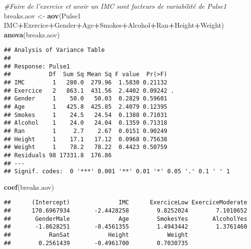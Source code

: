 \documentclass[]{article}
\newenvironment{Shaded}{\begin{snugshade}}{\end{snugshade}}
\newcommand{\KeywordTok}[1]{\textcolor[rgb]{0.13,0.29,0.53}{\textbf{#1}}}
\newcommand{\StringTok}[1]{\textcolor[rgb]{0.31,0.60,0.02}{#1}}
\newcommand{\CommentTok}[1]{\textcolor[rgb]{0.56,0.35,0.01}{\textit{#1}}}
\newcommand{\OperatorTok}[1]{\textcolor[rgb]{0.81,0.36,0.00}{\textbf{#1}}}
\newcommand{\NormalTok}[1]{#1}
\begin{document}
\begin{Shaded}
\begin{Highlighting}[]
\CommentTok{#Faire de l'exercice et avoir un IMC sont facteurs de variabilité de Pulse1}
\NormalTok{breaks.aov <-}\StringTok{ }\KeywordTok{aov}\NormalTok{(Pulse1 }\OperatorTok{~}\StringTok{ }\NormalTok{IMC}\OperatorTok{+}\NormalTok{Exercice}\OperatorTok{+}\NormalTok{Gender}\OperatorTok{+}\NormalTok{Age}\OperatorTok{+}\NormalTok{Smokes}\OperatorTok{+}\NormalTok{Alcohol}\OperatorTok{+}\NormalTok{Ran}\OperatorTok{+}\NormalTok{Height}\OperatorTok{+}\NormalTok{Weight)}
\KeywordTok{anova}\NormalTok{(breaks.aov)  }
\end{Highlighting}
\end{Shaded}

\begin{verbatim}
## Analysis of Variance Table
## 
## Response: Pulse1
##           Df  Sum Sq Mean Sq F value  Pr(>F)  
## IMC        1   280.0  279.96  1.5830 0.21132  
## Exercice   2   863.1  431.56  2.4402 0.09242 .
## Gender     1    50.0   50.03  0.2829 0.59601  
## Age        1   425.8  425.85  2.4079 0.12395  
## Smokes     1    24.5   24.54  0.1388 0.71031  
## Alcohol    1    24.0   24.04  0.1359 0.71318  
## Ran        1     2.7    2.67  0.0151 0.90249  
## Height     1    17.1   17.12  0.0968 0.75638  
## Weight     1    78.2   78.22  0.4423 0.50759  
## Residuals 98 17331.8  176.86                  
## ---
## Signif. codes:  0 '***' 0.001 '**' 0.01 '*' 0.05 '.' 0.1 ' ' 1
\end{verbatim}

\begin{Shaded}
\begin{Highlighting}[]
\KeywordTok{coef}\NormalTok{(breaks.aov)}
\end{Highlighting}
\end{Shaded}

\begin{verbatim}
##      (Intercept)              IMC      ExerciceLow ExerciceModerate 
##      170.6967934       -2.4428258        9.8252024        7.1010652 
##       GenderMale              Age        SmokesYes       AlcoholYes 
##       -1.8628251       -0.4561355        1.4943442        1.3761460 
##           RanSat           Height           Weight 
##        0.2561439       -0.4961700        0.7030735
\end{verbatim}
\end{document}
